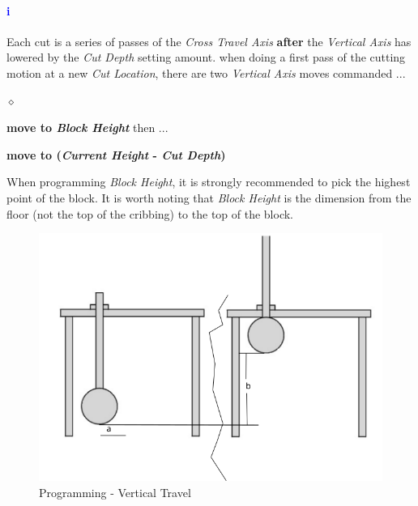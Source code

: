 \paragraph{\textbf{\LARGE \textcolor{blue}{i}}}Each cut is a series of passes of the \textit{Cross Travel Axis} \textbf{after} the \textit{Vertical Axis} has lowered by the \textit{Cut Depth} setting amount. when doing a first pass of the cutting motion at a new \textit{Cut Location}, there are two \textit{Vertical Axis} moves commanded ...
\begin{list}{$\diamond$}{}
	\item \textbf{move to \textit{Block Height}} then ...
	\item \textbf{move to (\textit{Current Height} - \textit{Cut Depth})}
\end{list}
When programming \textit{Block Height}, it is strongly recommended to pick the highest point of the block. It is worth noting that \textit{Block Height} is the dimension from the floor (not the top of the cribbing) to the top of the block.
\begin{figure}
	\centering
	\includegraphics[width=0.5\linewidth]{screen-captures/program/kodiak-saw-vert-travel}
	\caption{Programming - Vertical Travel}
	\label{fig:prg-vert-travel}
\end{figure}
\newpage
